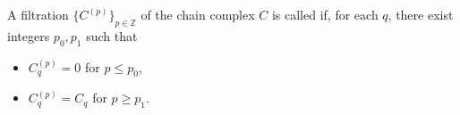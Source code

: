 A filtration $\{C^{(p)}\}_{p \in \mathbb{Z}}$ of the chain complex $C$ is called  if, for each $q$, there exist integers $p_0, p_1$ such that
\begin{itemize}
\item[(i)] $C_q^{(p)} = 0$ for $p \leq p_0$,
\item[(ii)] $C_q^{(p)} = C_q$ for $p \geq p_1$.
\end{itemize}
